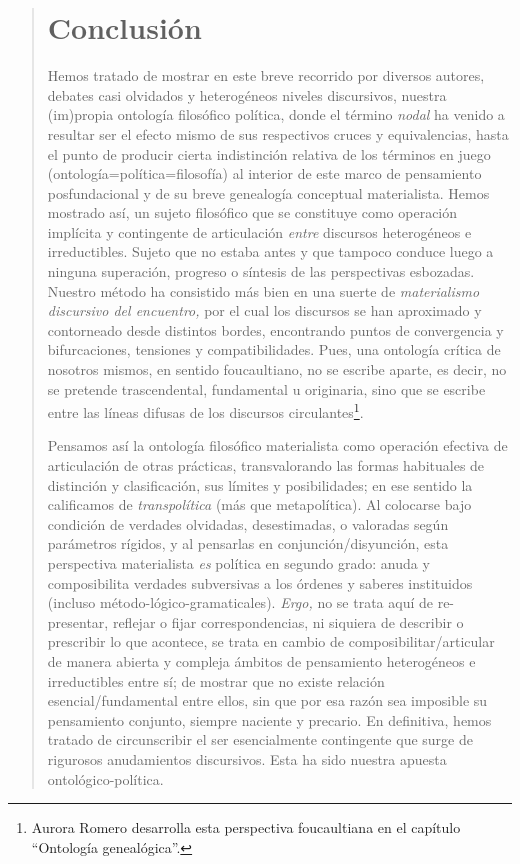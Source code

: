\begin{quote}
\section{Conclusión}

Hemos tratado de mostrar en este breve recorrido por diversos autores, debates casi olvidados y heterogéneos niveles discursivos, nuestra (im)propia ontología filosófico política, donde el término \emph{nodal} ha venido a resultar ser el efecto mismo de sus respectivos cruces y equivalencias, hasta el punto de producir cierta indistinción relativa de los términos en juego (ontología=política=filosofía) al interior de este marco de pensamiento posfundacional y de su breve genealogía conceptual materialista. Hemos mostrado así, un sujeto filosófico que se constituye como operación implícita y contingente de articulación \emph{entre} discursos heterogéneos e irreductibles. Sujeto que no estaba antes y que tampoco conduce luego a ninguna superación, progreso o síntesis de las perspectivas esbozadas. Nuestro método ha consistido más bien en una suerte de \emph{materialismo discursivo del encuentro,} por el cual los discursos se han aproximado y contorneado desde distintos bordes, encontrando puntos de convergencia y bifurcaciones, tensiones y compatibilidades. Pues, una ontología crítica de nosotros mismos, en sentido foucaultiano, no se escribe aparte, es decir, no se pretende trascendental, fundamental u originaria, sino que se escribe entre las líneas difusas de los discursos circulantes\footnote{Aurora Romero desarrolla esta perspectiva foucaultiana en el capítulo \enquote{Ontología genealógica}.}.

Pensamos así la ontología filosófico materialista como operación efectiva de articulación de otras prácticas, transvalorando las formas habituales de distinción y clasificación, sus límites y posibilidades; en ese sentido la calificamos de \emph{transpolítica} (más que metapolítica). Al colocarse bajo condición de verdades olvidadas, desestimadas, o valoradas según parámetros rígidos, y al pensarlas en conjunción/disyunción, esta perspectiva materialista \emph{es} política en segundo grado: anuda y composibilita verdades subversivas a los órdenes y saberes instituidos (incluso método-lógico-gramaticales). \emph{Ergo,} no se trata aquí de re-presentar, reflejar o fijar correspondencias, ni siquiera de describir o prescribir lo que acontece, se trata en cambio de composibilitar/articular de manera abierta y compleja ámbitos de pensamiento heterogéneos e irreductibles entre sí; de mostrar que no existe relación esencial/fundamental entre ellos, sin que por esa razón sea imposible su pensamiento conjunto, siempre naciente y precario. En definitiva, hemos tratado de circunscribir el ser esencialmente contingente que surge de rigurosos anudamientos discursivos. Esta ha sido  nuestra apuesta ontológico-política.



\end{quote}
